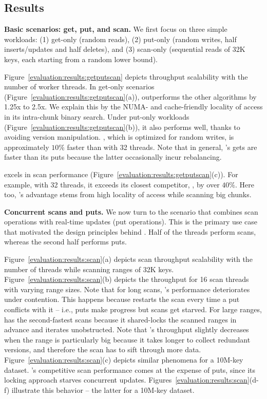 \subsection{Results}

\textbf{Basic scenarios: get, put, and scan.} 
We first focus on three simple workloads: 
(1) get-only (random reads), 
(2) put-only (random writes, half inserts/updates and half deletes), and 
(3) scan-only (sequential reads of 32K keys, each starting from a random lower bound).  

Figure~\ref{evaluation:results:getputscan} depicts throughput scalability with the number of worker threads. 
In get-only scenarios (Figure~\ref{evaluation:results:getputscan}(a)), {\kiwi} outperforms the other 
algorithms by 1.25x to 2.5x. We explain this by the NUMA- and cache-friendly locality of access in its intra-chunk binary search. 
Under put-only workloads (Figure~\ref{evaluation:results:getputscan}(b)), it also performs well, thanks to avoiding version
manipulation. {\snaptree}, which is optimized for random writes, is approximately $10\%$ faster than {\kiwi}
with 32 threads. Note that in general, {\kiwi}'s gets are faster than its puts because the latter occasionally incur rebalancing. 

{\kiwi} excels in scan performance (Figure~\ref{evaluation:results:getputscan}(c)). 
For example, with 32 threads, it exceeds its closest competitor, {\kary}, by over $40\%$. 
Here too, {\kiwi}'s advantage stems from high locality of access while scanning big chunks. 

\textbf{Concurrent scans and puts.}
We now turn to the scenario that combines scan operations with 
real-time updates (put operations). This is the primary use case that motivated 
the design principles behind {\kiwi}. Half of the threads perform scans, whereas 
the second half performs puts. 

Figure~\ref{evaluation:results:scan}(a) depicts scan throughput scalability with the number of threads
while scanning ranges of 32K keys. Figure~\ref{evaluation:results:scan}(b) depicts the throughput for 16 scan 
threads with varying range sizes. Note that for long scans, {\kary}'s performance deteriorates under contention. 
This happens because {\kary} restarts the scan every time a put conflicts with it -- i.e., puts make progress 
but scans get starved. For large ranges, {\snaptree} has the second-fastest scans because it shared-locks 
the scanned ranges in advance and iterates unobstructed. 
Note that {\kiwi}'s throughput slightly decreases when the range is particularly big 
because it takes longer to collect redundant versions, and therefore the scan has to sift through 
more data. Figure~\ref{evaluation:results:scan}(c) depicts similar phenomena for a 10M-key dataset.
%
{\snaptree}'s competitive scan performance comes at the expense of puts, 
since its locking approach starves concurrent updates. Figures~\ref{evaluation:results:scan}(d-f) 
 illustrate this behavior -- the latter for a 10M-key dataset.

